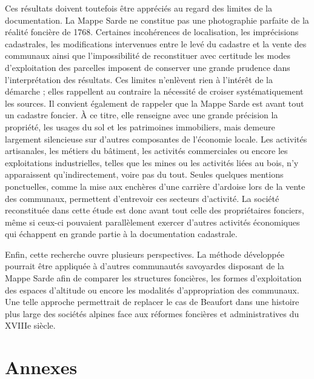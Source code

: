 \documentclass[12pt,a4paper]{report}
\begin{document}
Ces résultats doivent toutefois être appréciés au regard des limites de la documentation. La Mappe Sarde ne constitue pas une photographie parfaite de la réalité foncière de 1768. Certaines incohérences de localisation, les imprécisions cadastrales, les modifications intervenues entre le levé du cadastre et la vente des communaux ainsi que l'impossibilité de reconstituer avec certitude les modes d'exploitation des parcelles imposent de conserver une grande prudence dans l'interprétation des résultats. Ces limites n'enlèvent rien à l'intérêt de la démarche ; elles rappellent au contraire la nécessité de croiser systématiquement les sources.
Il convient également de rappeler que la Mappe Sarde est avant tout un cadastre foncier. À ce titre, elle renseigne avec une grande précision la propriété, les usages du sol et les patrimoines immobiliers, mais demeure largement silencieuse sur d'autres composantes de l'économie locale. Les activités artisanales, les métiers du bâtiment, les activités commerciales ou encore les exploitations industrielles, telles que les mines ou les activités liées au bois, n'y apparaissent qu'indirectement, voire pas du tout. Seules quelques mentions ponctuelles, comme la mise aux enchères d'une carrière d'ardoise lors de la vente des communaux, permettent d'entrevoir ces secteurs d'activité. La société reconstituée dans cette étude est donc avant tout celle des propriétaires fonciers, même si ceux-ci pouvaient parallèlement exercer d'autres activités économiques qui échappent en grande partie à la documentation cadastrale.

Enfin, cette recherche ouvre plusieurs perspectives. La méthode développée pourrait être appliquée à d'autres communautés savoyardes disposant de la Mappe Sarde afin de comparer les structures foncières, les formes d'exploitation des espaces d'altitude ou encore les modalités d'appropriation des communaux. Une telle approche permettrait de replacer le cas de Beaufort dans une histoire plus large des sociétés alpines face aux réformes foncières et administratives du XVIIIe siècle.
	
	
	
	

\appendix

\chapter*{Annexes}




\end{document}
